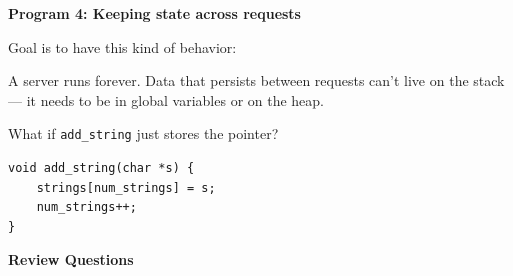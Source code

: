 \documentclass[oneside, landscape]{article}
\begin{document}
\newpage


\begin{minipage}[t]{0.40\textwidth}

\textbf{Program 4: Keeping state across requests}

Goal is to have this kind of behavior:



\vspace{0.5em}

A server runs forever. Data that persists between requests can't live on the
stack — it needs to be in global variables or on the heap.

\vspace{1em}

What if \texttt{add\_string} just stores the pointer?

\begin{lstlisting}[basicstyle=\ttfamily\footnotesize, numbers=none]
void add_string(char *s) {
    strings[num_strings] = s;
    num_strings++;
}
\end{lstlisting}



\end{minipage}
\hfill
\begin{minipage}[t]{0.55\textwidth}

%
\vspace{4\baselineskip}%
%
\vspace{2\baselineskip}%


\end{minipage}

\newpage


\textbf{Review Questions}
\end{document}
